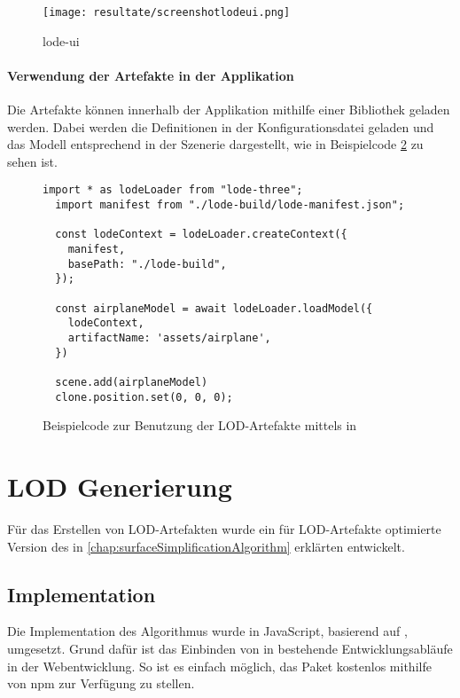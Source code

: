 \begin{figure}[H]
  \centering
  \texttt{[image: resultate/screenshotlodeui.png]}
  \caption{lode-ui}
  \label{fig:lodeui}
\end{figure}

\paragraph{Verwendung der Artefakte in der Applikation}
Die Artefakte können innerhalb der Applikation mithilfe einer Bibliothek geladen werden. Dabei werden die Definitionen in der Konfigurationsdatei geladen und das Modell entsprechend in der Szenerie dargestellt, wie in Beispielcode \ref{code:lodeThreeUsage} zu sehen ist.

\begin{figure}[H]
  \begin{lstlisting}[style=JavaScript]
  import * as lodeLoader from "lode-three";
  import manifest from "./lode-build/lode-manifest.json";

  const lodeContext = lodeLoader.createContext({
    manifest,
    basePath: "./lode-build",
  });

  const airplaneModel = await lodeLoader.loadModel({
    lodeContext,
    artifactName: 'assets/airplane',
  })

  scene.add(airplaneModel)
  clone.position.set(0, 0, 0);
  \end{lstlisting}
  \caption{Beispielcode zur Benutzung der LOD-Artefakte mittels  in }
  \label{code:lodeThreeUsage}
\end{figure}

\section{LOD Generierung}

Für das Erstellen von LOD-Artefakten wurde ein für LOD-Artefakte optimierte Version des in \autoref{chap:surfaceSimplificationAlgorithm} erklärten  entwickelt.

\subsection{Implementation}

Die Implementation des Algorithmus wurde in JavaScript, basierend auf , umgesetzt. Grund dafür ist das Einbinden von  in bestehende Entwicklungsabläufe in der Webentwicklung. So ist es einfach möglich, das Paket kostenlos mithilfe von \gls{npm} zur Verfügung zu stellen.

